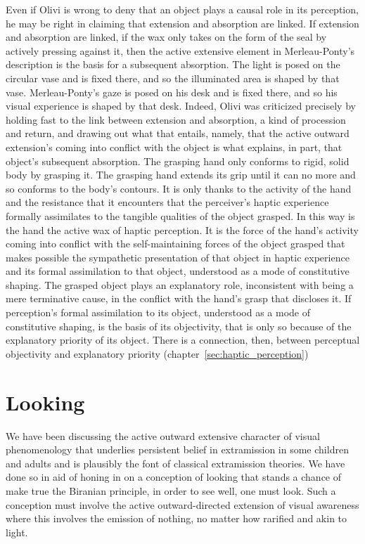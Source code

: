 Even if Olivi is wrong to deny that an object plays a causal role in its perception, he may be right in claiming that extension and absorption are linked. If extension and absorption are linked, if the wax only takes on the form of the seal by actively pressing against it, then the active extensive element in Merleau-Ponty's description is the basis for a subsequent absorption. The light is posed on the circular vase and is fixed there, and so the illuminated area is shaped by that vase. Merleau-Ponty's gaze is posed on his desk and is fixed there, and so his visual experience is shaped by that desk. Indeed, Olivi was criticized precisely by holding fast to the link between extension and absorption, a kind of procession and return, and drawing out what that entails, namely, that the active outward extension's coming into conflict with the object is what explains, in part, that object's subsequent absorption. The grasping hand only conforms to rigid, solid body by grasping it. The grasping hand extends its grip until it can no more and so conforms to the body's contours. It is only thanks to the activity of the hand and the resistance that it encounters that the perceiver's haptic experience formally assimilates to the tangible qualities of the object grasped. In this way is the hand the active wax of haptic perception. It is the force of the hand's activity coming into conflict with the self-maintaining forces of the object grasped that makes possible the sympathetic presentation of that object in haptic experience and its formal assimilation to that object, understood as a mode of constitutive shaping. The grasped object plays an explanatory role, inconsistent with being a mere terminative cause, in the conflict with the hand's grasp that discloses it. If perception's formal assimilation to its object, understood as a mode of constitutive shaping, is the basis of its objectivity, that is only so because of the explanatory priority of its object. There is a connection, then, between perceptual objectivity and explanatory priority (chapter~\ref{sec:haptic_perception})


\section{Looking} %
\label{sec:looking}

We have been discussing the active outward extensive character of visual phenomenology that underlies persistent belief in extramission in some children and adults and is plausibly the font of classical extramission theories. We have done so in aid of honing in on a conception of looking that stands a chance of make true the Biranian principle, in order to see well, one must look. Such a conception must involve the active outward-directed extension of visual awareness where this involves the emission of nothing, no matter how rarified and akin to light. 


